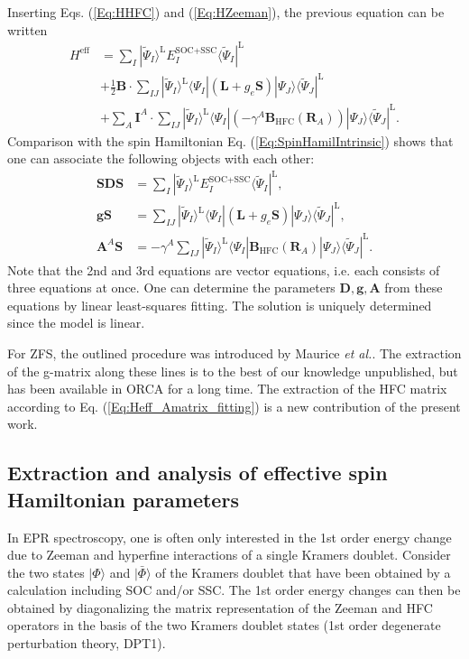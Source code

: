 Inserting Eqs. (\ref{Eq:HHFC}) and (\ref{Eq:HZeeman}), the previous equation can be written
\begin{equation}
  \begin{aligned}
    H^\text{eff} &= \sum_I |\tilde{\Psi}_I\rangle^\text{L} E_I^\text{SOC+SSC} \langle \tilde{\Psi}_I|^\text{L} \\
               &+ \frac{1}{2} \mathbf{B} \cdot \sum_{IJ} |\tilde{\Psi}_I \rangle^\text{L} \langle \Psi_I | (\mathbf{L} + g_e \mathbf{S}) | \Psi_J \rangle \langle \tilde{\Psi}_J |^\text{L} \\
               &+ \sum_A \mathbf{I}^A \cdot \sum_{IJ} |\tilde{\Psi}_I \rangle^\text{L}\langle \Psi_I | (-\gamma^A \mathbf{B}_\text{HFC}(\mathbf{R}_A)) | \Psi_J \rangle\langle \tilde{\Psi}_J |^\text{L}.
  \end{aligned}
\end{equation}
Comparison with the spin Hamiltonian Eq. (\ref{Eq:SpinHamilIntrinsic}) shows that one can associate the following objects with each other:
\begin{align}
  \mathbf{S} \mathbf{D} \mathbf{S} &= \sum_I |\tilde{\Psi}_I\rangle^\text{L} E_I^\text{SOC+SSC} \langle \tilde{\Psi}_I|^\text{L}, \\
  \mathbf{g}\mathbf{S} &= \sum_{IJ} |\tilde{\Psi}_I \rangle^\text{L} \langle \Psi_I | (\mathbf{L} + g_e \mathbf{S}) | \Psi_J \rangle \langle \tilde{\Psi}_J |^\text{L}, \\
  \mathbf{A}^A\mathbf{S} &= - \gamma^A \sum_{IJ} |\tilde{\Psi}_I \rangle^\text{L}\langle \Psi_I |  \mathbf{B}_\text{HFC}(\mathbf{R}_A) | \Psi_J \rangle\langle \tilde{\Psi}_J |^\text{L}. \label{Eq:Heff_Amatrix_fitting}
\end{align}
Note that the 2nd and 3rd equations are vector equations, i.e. each consists of three equations at once.
One can determine the parameters $\mathbf{D}, \mathbf{g}, \mathbf{A}$ from these equations by linear least-squares fitting. The solution is uniquely determined since the model is linear.\cite{Penro_1956_17}

For ZFS, the outlined procedure was introduced by Maurice \textit{et al.}\cite{MauriBGSMG_2009_2977}. The extraction of the g-matrix along these lines is to the best of our knowledge unpublished, but has been available in ORCA for a long time. The extraction of the HFC matrix according to Eq. (\ref{Eq:Heff_Amatrix_fitting}) is a new contribution of the present work.

\subsection{Extraction and analysis of effective spin Hamiltonian parameters}
In EPR spectroscopy, one is often only interested in the 1st order energy change due to Zeeman and hyperfine interactions of a single Kramers doublet. Consider the two states $|\Phi \rangle $ and $|\bar \Phi \rangle $ of the Kramers doublet that have been obtained by a calculation including SOC and/or SSC. The 1st order energy changes can then be obtained by diagonalizing the matrix representation of the Zeeman and HFC operators in the basis of the two Kramers doublet states (1st order degenerate perturbation theory, DPT1).

